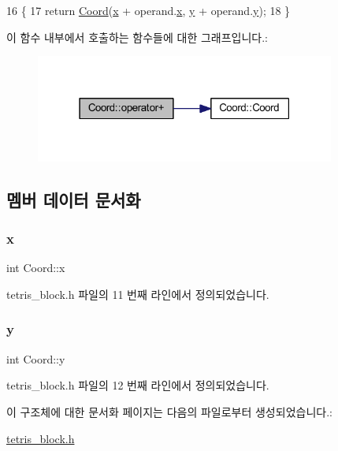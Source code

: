 \begin{DoxyCode}
16     \{
17         \textcolor{keywordflow}{return} \mbox{\hyperlink{struct_coord_a46e518631fa539ebb8a7f2a5b59fd483}{Coord}}(\mbox{\hyperlink{struct_coord_a696eaa744360fc791d0e3b331c549dbe}{x}} + operand.\mbox{\hyperlink{struct_coord_a696eaa744360fc791d0e3b331c549dbe}{x}}, \mbox{\hyperlink{struct_coord_a214166cca70cef7dda9201689c3e81ab}{y}} + operand.\mbox{\hyperlink{struct_coord_a214166cca70cef7dda9201689c3e81ab}{y}});
18     \}
\end{DoxyCode}
이 함수 내부에서 호출하는 함수들에 대한 그래프입니다.\+:
\nopagebreak
\begin{figure}[H]
\begin{center}
\leavevmode
\includegraphics[width=279pt]{struct_coord_ad564b77330c90986e1586d2d04aad6f9_cgraph}
\end{center}
\end{figure}


\subsection{멤버 데이터 문서화}
\mbox{\label{struct_coord_a696eaa744360fc791d0e3b331c549dbe}} 
\subsubsection{\texorpdfstring{x}{x}}
{\footnotesize\ttfamily int Coord\+::x}



tetris\+\_\+block.\+h 파일의 11 번째 라인에서 정의되었습니다.

\mbox{\label{struct_coord_a214166cca70cef7dda9201689c3e81ab}} 
\subsubsection{\texorpdfstring{y}{y}}
{\footnotesize\ttfamily int Coord\+::y}



tetris\+\_\+block.\+h 파일의 12 번째 라인에서 정의되었습니다.



이 구조체에 대한 문서화 페이지는 다음의 파일로부터 생성되었습니다.\+:\begin{DoxyCompactItemize}
\item 
\mbox{\hyperlink{tetris__block_8h}{tetris\+\_\+block.\+h}}\end{DoxyCompactItemize}
